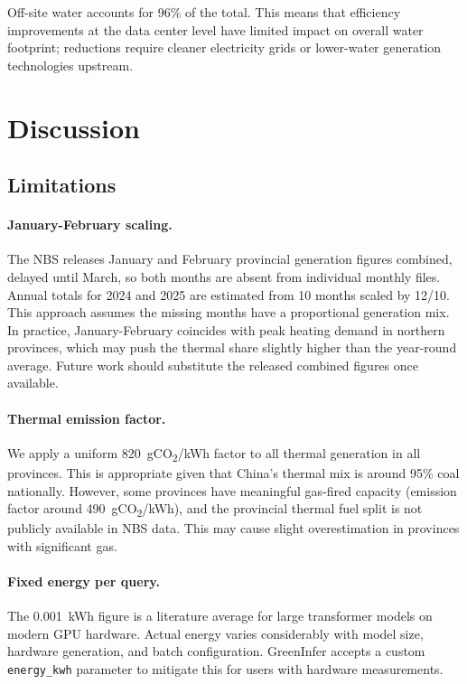 \documentclass[11pt,a4paper]{article}
\begin{document}
Off-site water accounts for 96\% of the total. This means that efficiency
improvements at the data center level have limited impact on overall water
footprint; reductions require cleaner electricity grids or lower-water
generation technologies upstream.

\section{Discussion}

\subsection{Limitations}
\label{sec:limitations}

\paragraph{January-February scaling.}
The NBS releases January and February provincial generation figures combined,
delayed until March, so both months are absent from individual monthly
files. Annual totals for 2024 and 2025 are estimated from 10 months scaled
by 12/10. This approach assumes the missing months have a proportional
generation mix. In practice, January-February coincides with peak heating
demand in northern provinces, which may push the thermal share slightly
higher than the year-round average. Future work should substitute the
released combined figures once available.

\paragraph{Thermal emission factor.}
We apply a uniform 820~gCO\textsubscript{2}/kWh factor to all thermal
generation in all provinces. This is appropriate given that China's thermal
mix is around 95\% coal nationally. However, some provinces have meaningful
gas-fired capacity (emission factor around 490~gCO\textsubscript{2}/kWh),
and the provincial thermal fuel split is not publicly available in NBS data.
This may cause slight overestimation in provinces with significant gas.

\paragraph{Fixed energy per query.}
The 0.001~kWh figure is a literature average for large transformer models on
modern GPU hardware. Actual energy varies considerably with model size,
hardware generation, and batch configuration. GreenInfer accepts a custom
\texttt{energy\_kwh} parameter to mitigate this for users with hardware
measurements.
\end{document}
